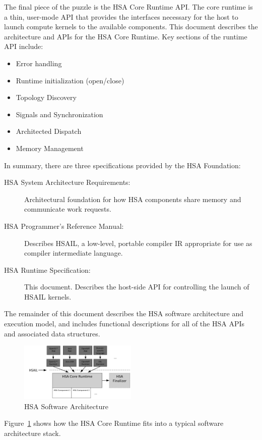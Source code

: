\documentclass[draft]{book}
\begin{document}
The final piece of the puzzle is the HSA Core Runtime API. The core runtime is
a thin, user-mode API that provides the interfaces necessary for the host to
launch compute kernels to the available components. This document describes the
architecture and APIs for the HSA Core Runtime. Key sections of the runtime API
include:
\begin{itemize}
\item Error handling
\item Runtime initialization (open/close)
\item Topology Discovery
\item Signals and Synchronization
\item Architected Dispatch
\item Memory Management
\end{itemize}
In summary, there are three specifications provided by the HSA
Foundation:
\begin{description}
\item[HSA System Architecture Requirements:] Architectural foundation for
how HSA components share memory and communicate work requests.
\item[HSA Programmer's Reference Manual:] Describes HSAIL, a low-level,
portable compiler IR appropriate for use as compiler intermediate
language.
\item[HSA Runtime Specification:] This document. Describes the host-side
API for controlling the launch of HSAIL kernels.
\end{description}

The remainder of this document describes the HSA software architecture and
execution model, and includes functional descriptions for all of the HSA APIs
and associated data structures.

\begin{figure}
  \centering
  \includegraphics[width=0.5\textwidth]{fig/swarch}
  \centering
  \caption{HSA Software Architecture}
  \label{fig:swarch}
\end{figure}

Figure~\ref{fig:swarch} shows how the HSA Core Runtime fits into a
typical software architecture stack.
\end{document}
